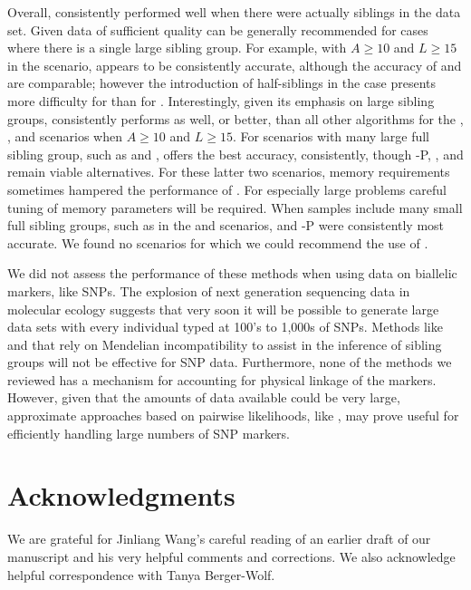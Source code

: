 Overall, \colony{} consistently performed well when
there were actually siblings in the data set.  
Given data of sufficient quality
\prt{} can be generally recommended for cases where there is a single large
sibling group. For example, with $A\geq 10$ and $L\geq 15$ 
in the \onelargenoh{} scenario, \prt{} appears to be consistently 
accurate, although the accuracy of \colony{} 
and \familyfinder{} are comparable; however the introduction of 
half-siblings in the \onelargewh{} case presents more difficulty for
\prt{} than for \colony{}.  
Interestingly, given its emphasis on large 
sibling groups, \prt{} consistently performs as well, or better, than all other algorithms for the 
\nosibs{}, \allhalf{}, and \allpathalf{} scenarios when $A\geq10$ and $L\geq15$. 
For scenarios with many large full sibling group, such as \slfsgnoh{} and \slfsgwh{},
\colony{} offers the best accuracy, consistently, though \colony{}-P, \familyfinder{}, and 
\prt{} remain viable alternatives.  
For these latter two scenarios, memory requirements sometimes hampered the 
performance of \prt{}. For especially large problems careful tuning of memory parameters will be 
required. 
When samples include many small full sibling groups, such as in the \sfsnoh{} and  \sfswh{} scenarios, \colony{} and \colony-P were consistently most accurate.   
We found no scenarios for which we could recommend the use of \kinalyzer{}.


We did not assess the performance of these methods when using data on biallelic
markers, like SNPs.  The explosion of next generation sequencing data 
in molecular ecology suggests that very soon it will be possible to 
generate large data sets with every individual typed at 100's to 1,000s
of SNPs.  Methods like \prt{} and \kinalyzer{} that rely on Mendelian 
incompatibility to assist in the inference of sibling groups will not
be effective for SNP data. Furthermore, none of the methods we reviewed 
has a mechanism for accounting for physical linkage of the markers.
However, given that the amounts of data available
could be very large, approximate approaches based on pairwise likelihoods,
like \familyfinder{}, may prove useful for efficiently handling 
large numbers of SNP markers.




\section*{Acknowledgments}
We are grateful for Jinliang Wang's careful reading of an earlier draft of our manuscript and his very helpful
comments and corrections.  We also acknowledge helpful correspondence with Tanya Berger-Wolf.
